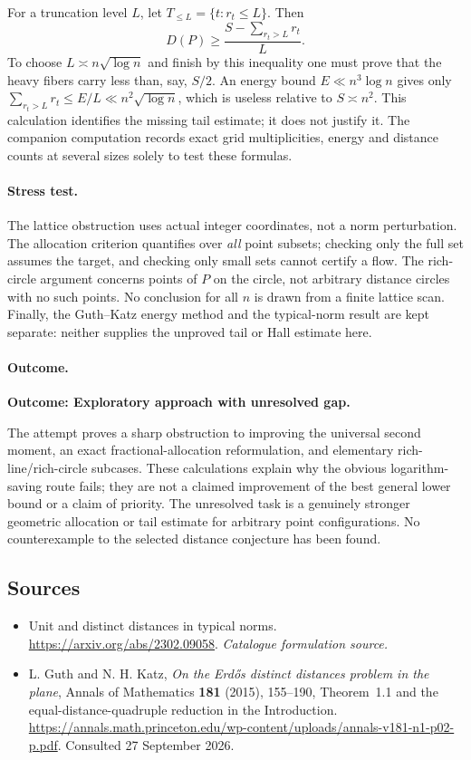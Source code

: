 \documentclass[11pt,a4paper]{article}
\numberwithin{equation}{section}
\begin{document}
For a truncation level $L$, let $T_{\le L}=\{t:r_t\le L\}$. Then
\[
 D(P)\ge \frac{S-\sum_{r_t>L}r_t}{L}.
\]
To choose $L\asymp n\sqrt{\log n}$ and finish by this inequality one
must prove that the heavy fibers carry less than, say, $S/2$.
An energy bound $E\ll n^3\log n$ gives only
$\sum_{r_t>L}r_t\le E/L\ll n^2\sqrt{\log n}$, which is useless relative
to $S\asymp n^2$. This calculation identifies the missing tail estimate;
it does not justify it. The companion computation records exact grid
multiplicities, energy and distance counts at several sizes solely to
test these formulas.

\paragraph{Stress test.}
The lattice obstruction uses actual integer coordinates, not a norm
perturbation. The allocation criterion quantifies over \emph{all} point
subsets; checking only the full set assumes the target, and checking only
small sets cannot certify a flow. The rich-circle argument concerns
points of $P$ on the circle, not arbitrary distance circles with no such
points. No conclusion for all $n$ is drawn from a finite lattice scan.
Finally, the Guth--Katz energy method and the typical-norm result are
kept separate: neither supplies the unproved tail or Hall estimate here.

\paragraph{Outcome.}
\textbf{Outcome: Exploratory approach with unresolved gap.}

The attempt proves a sharp obstruction to improving the universal second
moment, an exact fractional-allocation reformulation, and elementary
rich-line/rich-circle subcases. These calculations explain why the
obvious logarithm-saving route fails; they are not a claimed improvement
of the best general lower bound or a claim of priority.
The unresolved task is a genuinely stronger geometric allocation or
tail estimate for arbitrary point configurations. No counterexample to
the selected distance conjecture has been found.
\subsection{Sources}
\begin{itemize}\raggedright
\item[\textnormal{[S1]}]\hypertarget{source:statement:1}{} Unit and distinct distances in typical norms.
\url{https://arxiv.org/abs/2302.09058}.
{\small\textit{Catalogue formulation source.}}
\item[\textnormal{[E1]}]\hypertarget{extra:statement:1}{}
L. Guth and N. H. Katz, \emph{On the Erd\H{o}s distinct distances problem
in the plane}, Annals of Mathematics \textbf{181} (2015), 155--190,
Theorem~1.1 and the equal-distance-quadruple reduction in the Introduction.
\url{https://annals.math.princeton.edu/wp-content/uploads/annals-v181-n1-p02-p.pdf}.
Consulted 27 September 2026.
\end{itemize}
\end{document}
